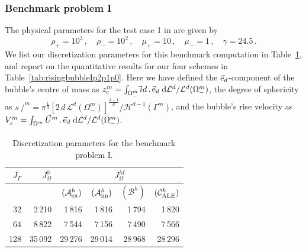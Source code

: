 \documentclass[a4paper,12pt,onecolumn]{article}
\newcommand{\vol}{\mathcal{L}^d}
\newcommand{\surfvol}{\mathcal{H}^{d-1}}
\newcommand{\dL}[1]{\;{\rm d}{\cal L}^{#1}} %
\newcommand{\id}{\rm id}
\newcommand{\strikes}{\mbox{$s\!\!\!\!\:/$}}
\newcommand{\schemeAex}{{\mathcal{A}^h_{\rm ex}}}
\newcommand{\schemeAim}{{\mathcal{A}^h_{\rm im}}}
\newcommand{\schemeB}{{\mathcal{B}^h}}
\newcommand{\schemeALE}{{\mathcal{C}^h_{\rm ALE}}}
\newcommand{\ek}{{\rm e}}
\begin{document}
\subsubsection{Benchmark problem I}
The physical parameters for the test case 1 in \cite[Table~I]{HysingTKPBGT09}
are given by
\begin{equation} \label{eq:Hysing1}
\rho_+ = 10^3\,,\quad \rho_- = 10^2\,,\quad \mu_+ = 10\,,\quad \mu_- = 1\,,\quad
\gamma = 24.5\,.
\end{equation}
We list our discretization parameters for this benchmark computation
in Table~\ref{tab:risingbubble2Delements}, and report on the quantitative
results for our four schemes in Table~\ref{tab:risingbubbleIp2p1p0}.
Here we have defined the $\vec\ek_d$-component of the bubble's centre of mass
as $z_c^m = \int_{\Omega_-^m} \vec\id\,.\,\vec\ek_d \dL{d} / \vol(\Omega_-^m)$,
the degree of sphericity as
$\strikes^m ={\pi^{\frac{1}{d}}[2\,d\,\vol(\Omega_-^m)]^\frac{d-1}{d}}/
{\surfvol(\Gamma^m)}$, and the bubble's rise velocity as
$V^m_c = \int_{\Omega_-^m}\vec U^m\,.\,\vec\ek_d \dL{d} / \vol(\Omega_-^m)$.
\begin{table}
\center
\begin{tabular}{rrrrrr}
\hline
$J_\Gamma$ & $J_\Omega^0$ & \multicolumn{4}{c}{$J_\Omega^M$} \\ \hline
& & $(\schemeAex)$ & $(\schemeAim)$ & $(\schemeB)$ & $(\schemeALE)$ \\
\hline
 32 &  2\,210 &  1\,816 &  1\,816 &  1\,794 &  1\,820 \\
 64 &  8\,822 &  7\,544 &  7\,156 &  7\,490 &  7\,566 \\
128 & 35\,092 & 29\,276 & 29\,014 & 28\,968 & 28\,296 \\
\hline
\end{tabular}
\caption{Discretization parameters for the benchmark problem I.}
\label{tab:risingbubble2Delements}
\end{table}%
\end{document}

